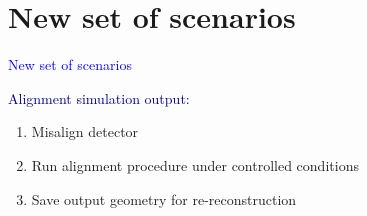 \documentclass[compress]{beamer}
\begin{document}
\section*{New set of scenarios}

\begin{frame}
\begin{center}
\Huge \textcolor{blue}{New set of scenarios}
\end{center}

\vspace{1 cm}
\textcolor{darkblue}{\large Alignment simulation output:}
\begin{enumerate}
\item Misalign detector
\item Run alignment procedure under controlled conditions
\item Save output geometry for re-reconstruction
\end{enumerate}
\end{frame}
\end{document}
